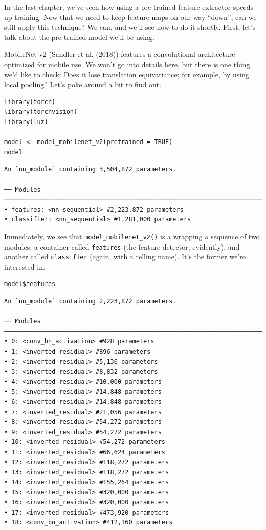 \documentclass[
  letterpaper,
]{krantz}
\begin{document}
In the last chapter, we've seen how using a pre-trained feature
extractor speeds up training. Now that we need to keep feature maps on
our way ``down'', can we still apply this technique? We can, and we'll
see how to do it shortly. First, let's talk about the pre-trained model
we'll be using.

MobileNet v2 (Sandler et al. (2018)) features a convolutional
architecture optimized for mobile use. We won't go into details here,
but there is one thing we'd like to check: Does it lose translation
equivariance; for example, by using local pooling? Let's poke around a
bit to find out.

\begin{verbatim}
library(torch)
library(torchvision)
library(luz)

model <- model_mobilenet_v2(pretrained = TRUE)
model
\end{verbatim}

\begin{verbatim}
An `nn_module` containing 3,504,872 parameters.

── Modules ──────────────────────────────────────────────────────────────────────────────────
• features: <nn_sequential> #2,223,872 parameters
• classifier: <nn_sequential> #1,281,000 parameters
\end{verbatim}

Immediately, we see that \texttt{model\_mobilenet\_v2()} is a wrapping a
sequence of two modules: a container called \texttt{features} (the
feature detector, evidently), and another called \texttt{classifier}
(again, with a telling name). It's the former we're interested in.

\begin{verbatim}
model$features
\end{verbatim}

\begin{verbatim}
An `nn_module` containing 2,223,872 parameters.

── Modules ──────────────────────────────────────────────────────────────────────────────────
• 0: <conv_bn_activation> #928 parameters
• 1: <inverted_residual> #896 parameters
• 2: <inverted_residual> #5,136 parameters
• 3: <inverted_residual> #8,832 parameters
• 4: <inverted_residual> #10,000 parameters
• 5: <inverted_residual> #14,848 parameters
• 6: <inverted_residual> #14,848 parameters
• 7: <inverted_residual> #21,056 parameters
• 8: <inverted_residual> #54,272 parameters
• 9: <inverted_residual> #54,272 parameters
• 10: <inverted_residual> #54,272 parameters
• 11: <inverted_residual> #66,624 parameters
• 12: <inverted_residual> #118,272 parameters
• 13: <inverted_residual> #118,272 parameters
• 14: <inverted_residual> #155,264 parameters
• 15: <inverted_residual> #320,000 parameters
• 16: <inverted_residual> #320,000 parameters
• 17: <inverted_residual> #473,920 parameters
• 18: <conv_bn_activation> #412,160 parameters
\end{verbatim}
\end{document}
